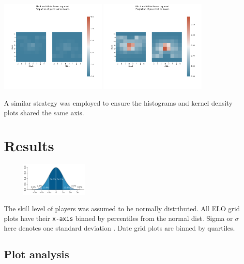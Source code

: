 \documentclass[11pt]{article}
\begin{document}
\begin{center}
\includegraphics[width=0.4\textwidth]{Images/DaenaliaEvandruile_HEATMAP_Pawn_WHITE_EXAMPLE_1_WITH_WRONG_COLOUR.png}
\includegraphics[width=0.4\textwidth]{Images/_HEATMAP_Pawn_FISC.png}
\end{center}
A similar strategy was employed to ensure the histograms and kernel density plots shared the same axis.

\newpage
\section{Results}
\label{sec:org73ad80c}
\begin{figure}
\centering
\includegraphics[width=0.3\textwidth]{Images/1920px-Standard_deviation_diagram.png}
\end{figure}
The skill level of players was assumed to be normally distributed. All ELO grid plots have their \texttt{x-axis} binned by percentiles from the normal dist. Sigma or \(\sigma\) here denotes one standard deviation \cite{NormalDist}.
Date grid plots are binned by quartiles.

\subsection{Plot analysis}
\label{sec:org1ba9e1c}
\end{document}
